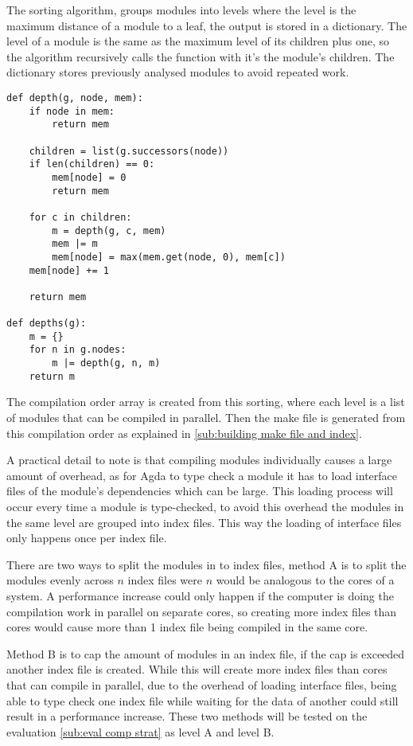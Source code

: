 The sorting algorithm, groups modules into levels where the level is the
maximum distance of a module to a leaf, the output is stored in a dictionary.
The level of a module is the same as the maximum level of its children plus
one, so the algorithm recursively calls the function with it's the module's
children. The dictionary stores previously analysed modules to avoid repeated
work.


\begin{lstlisting}
def depth(g, node, mem):
    if node in mem:
        return mem

    children = list(g.successors(node))
    if len(children) == 0:
        mem[node] = 0
        return mem

    for c in children:
        m = depth(g, c, mem)
        mem |= m
        mem[node] = max(mem.get(node, 0), mem[c])
    mem[node] += 1

    return mem

def depths(g):
    m = {}
    for n in g.nodes:
        m |= depth(g, n, m)
    return m
\end{lstlisting}

The compilation order array is created from this sorting, where each level is a
list of modules that can be compiled in parallel. Then the make file is
generated from this compilation order as explained in \cref{sub:building make
file and index}.

A practical detail to note is that compiling modules individually causes a
large amount of overhead, as for Agda to type check a module it has to load
interface files of the module's dependencies which can be large. This loading
process will occur every time a module is type-checked, to avoid this overhead
the modules in the same level are grouped into index files. This way the
loading of interface files only happens once per index file.

There are two ways to split the modules in to index files, method A is to split
the modules evenly across \(n\) index files were \(n\) would be analogous to
the cores of a system. A performance increase could only happen if the computer
is doing the compilation work in parallel on separate cores, so creating more
index files than cores would cause more than 1 index file being compiled in the
same core.

Method B is to cap the amount of modules in an index file, if the cap is
exceeded another index file is created. While this will create more index files
than cores that can compile in parallel, due to the overhead of loading
interface files, being able to type check one index file while waiting for the
data of another could still result in a performance increase. These two methods
will be tested on the evaluation \cref{sub:eval comp strat} as level A
and level B.

